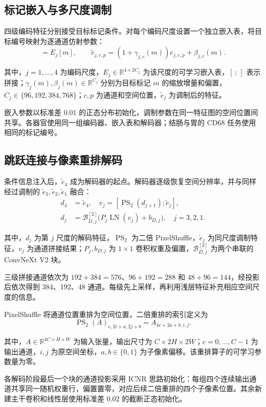 \documentclass[UTF8,a4paper,zihao=5,fontset=fandol]{ctexart}
\newcommand{\op}[1]{\operatorname{#1}}
\newcommand{\sym}[1]{\par\nobreak\noindent\begin{minipage}{\linewidth}#1\end{minipage}\par}
\begin{document}
\subsection{标记嵌入与多尺度调制}
四级编码特征分别接受目标标记条件。对每个编码尺度设置一个独立嵌入表，将目标编号映射为逐通道仿射参数：
\begin{equation}
[\gamma_j(m);\beta_j(m)]=E_j[m],\qquad
\widetilde e_{j,c,p}=(1+\gamma_{j,c}(m))e_{j,c,p}+\beta_{j,c}(m).
\label{eq:film}
\end{equation}
\sym{其中，$j=1,\ldots,4$ 为编码尺度，$E_j\in\mathbb R^{4\times2C_j}$ 为该尺度的可学习嵌入表，$[\,;\,]$ 表示拼接；$\gamma_j(m),\beta_j(m)\in\mathbb R^{C_j}$ 分别为目标标记 $m$ 的缩放增量和偏置，$C_j\in\{96,192,384,768\}$；$c,p$ 为通道和空间位置，$\widetilde e_j$ 为调制后的特征。}
嵌入参数以标准差 0.01 的正态分布初始化，调制参数在同一特征图的空间位置间共享。各器官使用同一组编码器、嵌入表和解码器；结肠与胃的 CD68 任务使用相同的标记编号。

\subsection{跳跃连接与像素重排解码}
条件信息注入后，$\widetilde e_4$ 成为解码器的起点。解码器逐级恢复空间分辨率，并与同样经过调制的 $\widetilde e_3,\widetilde e_2,\widetilde e_1$ 融合：
\begin{equation}
\begin{aligned}
d_4&=\widetilde e_4,\quad
v_j=[\op{PS}_2(d_{j+1});\widetilde e_j],\\
d_j&=\mathcal B_{D,j}^{[2]}\bigl(P_j\op{LN}(v_j)+b_{D,j}\bigr),
\quad j=3,2,1.
\end{aligned}
\label{eq:decoder}
\end{equation}
\sym{其中，$d_j$ 为第 $j$ 尺度的解码特征，$\op{PS}_2$ 为二倍 PixelShuffle，$\widetilde e_j$ 为同尺度调制特征，$v_j$ 为通道拼接结果；$P_j,b_{D,j}$ 为 $1\times1$ 卷积权重及偏置，$\mathcal B_{D,j}^{[2]}$ 为两个串联的 ConvNeXt V2 块。}
三级拼接通道依次为 $192+384=576$、$96+192=288$ 和 $48+96=144$，经投影后依次得到 384、192、48 通道。每级先上采样，再利用浅层特征补充相应空间尺度的信息。

PixelShuffle 将通道位置重排为空间位置\cite{espcn}，二倍重排的索引定义为
\begin{equation}
\op{PS}_2(A)_{c,2i+a,2j+b}=A_{4c+2a+b,i,j}.
\label{eq:ps}
\end{equation}
\sym{其中，$A\in\mathbb R^{4C\times H\times W}$ 为输入张量，输出尺寸为 $C\times2H\times2W$；$c=0,\ldots,C-1$ 为输出通道，$i,j$ 为原空间坐标，$a,b\in\{0,1\}$ 为子像素偏移。该重排算子的可学习参数量为零。}
各解码阶段最后一个块的通道投影采用 ICNR 思路\cite{icnr}初始化：每组四个连续输出通道共享同一随机权重行，偏置置零，对应后续二倍重排的四个子像素位置。其余新建主干卷积和线性层使用标准差 0.02 的截断正态初始化。
\end{document}
